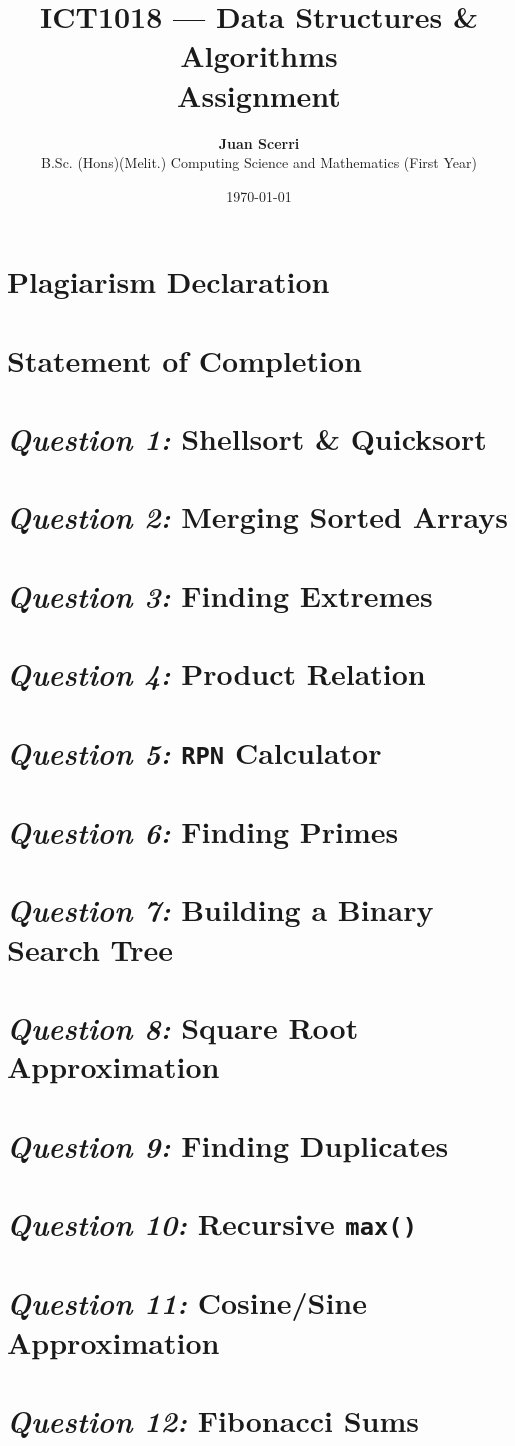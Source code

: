 \documentclass[12pt]{article}
\title{ICT1018 --- Data Structures \& Algorithms\\
\vspace{1em}\textbf{Assignment}}
\date{\today}
\author {{\textbf{Juan Scerri}}\\
B.Sc. (Hons)(Melit.) Computing Science and Mathematics (First Year)}
\begin{document}

\maketitle %

\thispagestyle{empty} %


\tableofcontents
\clearpage


\section{Plagiarism Declaration}
\section{Statement of Completion}
\section{\textit{Question 1:} Shellsort \& Quicksort}
\section{\textit{Question 2:} Merging Sorted Arrays}
\section{\textit{Question 3:} Finding Extremes}
\section{\textit{Question 4:} Product Relation}
\section{\textit{Question 5:} \texttt{RPN} Calculator}
\section{\textit{Question 6:} Finding Primes}
\section{\textit{Question 7:} Building a Binary Search Tree}
\section{\textit{Question 8:} Square Root Approximation}
\section{\textit{Question 9:} Finding Duplicates}
\section{\textit{Question 10:} Recursive \texttt{max()}}
\section{\textit{Question 11:} Cosine/Sine Approximation}
\section{\textit{Question 12:} Fibonacci Sums}
\end{document}

